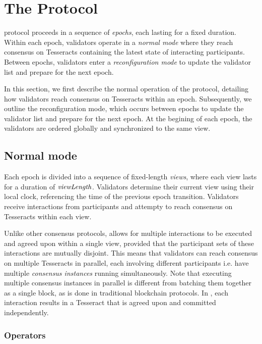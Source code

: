 \section{The Protocol}
\label{sec:protocol}

\codename{} protocol proceeds in a sequence of \emph{epochs}, each lasting for a fixed duration. Within each epoch, validators operate in a \emph{normal mode} where they reach consensus on Tesseracts containing the latest state of interacting participants.
Between epochs, validators enter a \emph{reconfiguration mode} to update the validator list and prepare for the next epoch.

In this section, we first describe the normal operation of the protocol, detailing how validators reach consensus on Tesseracts within an epoch. Subsequently, we outline the reconfiguration mode, which occurs between epochs to update the validator list and prepare for the next epoch. At the begining of each epoch, the validators are ordered globally and synchronized to the same view.

\subsection{Normal mode}

Each epoch is divided into a sequence of fixed-length \emph{views}, where each view lasts for a duration of $\mathit{viewLength}$. Validators determine their current view using their local clock, referencing the time of the previous epoch transition. Validators receive interactions from participants and attempty to reach consensus on Tesseracts within each view.

Unlike other consensus protocols, \codename{} allows for multiple interactions to be executed and agreed upon within a single view, provided that the participant sets of these interactions are mutually disjoint. This means that validators can reach consensus on multiple Tesseracts in parallel, each involving different participants i.e. have multiple \emph{consensus instances} running simultaneously. Note that executing multiple consensus instances in parallel is different from batching them together as a single block, as is done in traditional blockchain protocols. In \codename{}, each interaction results in a Tesseract that is agreed upon and committed independently.

\subsubsection{Operators}

